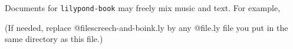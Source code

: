 \documentclass[a5paper,twoside,9pt]{extbook}
\begin{document}
Documents for \verb+lilypond-book+ may freely mix music and text.
For example,

(If needed, replace @file{screech-and-boink.ly} by any @file{.ly} file
you put in the same directory as this file.)
\end{document}
